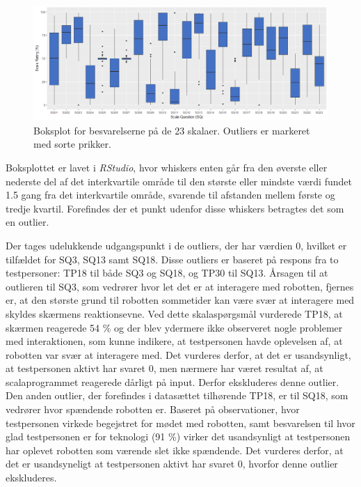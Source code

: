 %
\begin{figure}[H]
\centering
\includegraphics[width = \textwidth]{Figure/DatabehandlingSkalaer/BoksplotMed0er} 
\caption{Boksplot for besvarelserne på de 23 skalaer. Outliers er markeret med sorte prikker.}
\label{fig:Boxplot0er}
\end{figure}
\noindent
%
Boksplottet er lavet i \textit{RStudio}, hvor whiskers enten går fra den øverste eller nederste del af det interkvartile område til den største eller mindste værdi fundet 1.5 gang fra det interkvartile område, svarende til afstanden mellem første og tredje kvartil. Forefindes der et punkt udenfor disse whiskers betragtes det som en outlier.

Der tages udelukkende udgangspunkt i de outliers, der har værdien 0, hvilket er tilfældet for SQ3, SQ13 samt SQ18. Disse outliers er baseret på respons fra to testpersoner: TP18 til både SQ3 og SQ18, og TP30 til SQ13. Årsagen til at outlieren til SQ3, som vedrører hvor let det er at interagere med robotten, fjernes er, at den største grund til robotten sommetider kan være svær at interagere med skyldes skærmens reaktionsevne. Ved dette skalaspørgsmål vurderede TP18, at skærmen reagerede 54 \% og der blev ydermere ikke observeret nogle problemer med interaktionen, som kunne indikere, at testpersonen havde oplevelsen af, at robotten var svær at interagere med. Det vurderes derfor, at det er usandsynligt, at testpersonen aktivt har svaret 0, men nærmere har været resultat af, at scalaprogrammet reagerede dårligt på input. Derfor ekskluderes denne outlier. Den anden outlier, der forefindes i datasættet tilhørende TP18, er til SQ18, som vedrører hvor spændende robotten er. Baseret på observationer, hvor testpersonen virkede begejstret for mødet med robotten, samt besvarelsen til hvor glad testpersonen er for teknologi (91 \%) virker det usandsynligt at testpersonen har oplevet robotten som værende slet ikke spændende. Det vurderes derfor, at det er usandsyneligt at testpersonen aktivt har svaret 0, hvorfor denne outlier ekskluderes.

